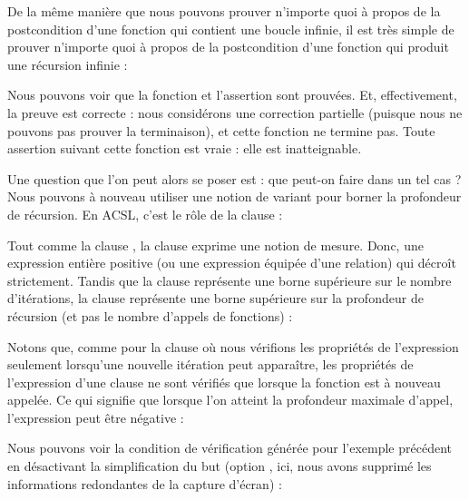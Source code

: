 

De la même manière que nous pouvons prouver n'importe quoi à propos de la
postcondition d'une fonction qui contient une boucle infinie, il est très simple
de prouver n'importe quoi à propos de la postcondition d'une fonction qui
produit une récursion infinie :






Nous pouvons voir que la fonction et l'assertion sont prouvées. Et, effectivement,
la preuve est correcte : nous considérons une correction partielle (puisque nous ne
pouvons pas prouver la terminaison), et cette fonction ne termine pas. Toute
assertion suivant cette fonction est vraie : elle est inatteignable.


Une question que l'on peut alors se poser est : que peut-on faire dans un tel
cas ? Nous pouvons à nouveau utiliser une notion de variant pour borner la
profondeur de récursion. En ACSL, c'est le rôle de la clause
 :




Tout comme la clause , la clause 
exprime une notion de mesure. Donc, une expression entière positive (ou une
expression équipée d'une relation) qui décroît strictement. Tandis que la clause
 représente une borne supérieure sur le nombre
d'itérations, la clause  représente une borne supérieure
sur la profondeur de récursion (et pas le nombre d'appels de fonctions) :




Notons que, comme pour la clause  où nous vérifions les
propriétés de l'expression seulement lorsqu'une nouvelle itération peut
apparaître, les propriétés de l'expression d'une clause 
ne sont vérifiés que lorsque la fonction est à nouveau appelée. Ce qui signifie
que lorsque l'on atteint la profondeur maximale d'appel, l'expression peut être
négative :




Nous pouvons voir la condition de vérification générée pour l'exemple précédent
en désactivant la simplification du but (option , ici,
nous avons supprimé les informations redondantes de la capture d'écran) :


